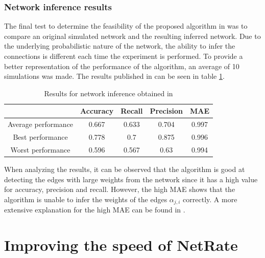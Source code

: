 \documentclass[11pt]{article}
\begin{document}
\subsubsection{Network inference results}

The final test to determine the feasibility of the proposed algorithm in \cite{alexandru2018estimating} was to compare an original simulated network and the resulting inferred network. Due to the underlying probabilistic nature of the network, the ability to infer the connections is different each time the experiment is performed. To provide a better representation of the performance of the algorithm, an average of 10 simulations was made. The results published in \cite{alexandru2018estimating} can be seen in table \ref{tab:results_pranav}.

\begin{table}
    \centering
    \begin{tabular}{|c|c|c|c|c|}
		\hline
		& Accuracy & Recall & Precision & MAE \\
		\hline
		Average performance & 0.667 & 0.633 & 0.704 & 0.997 \\
		\hline
		Best performance & 0.778 & 0.7 & 0.875 & 0.996  \\
		\hline
		Worst performance & 0.596 & 0.567 & 0.63 & 0.994 \\
		\hline
		\end{tabular}
		\caption{Results for network inference obtained in \cite{alexandru2018estimating}}
		\label{tab:results_pranav}
\end{table}

When analyzing the results, it can be observed that the algorithm is good at detecting the edges with large weights from the network since it has a high value for accuracy, precision and recall. However, the high MAE shows that the algorithm is unable to infer the weights of the edges $\alpha_{j,i}$ correctly. A more extensive explanation for the high MAE can be found in \cite{pranav_report}.


\section{Improving the speed of NetRate}
\end{document}
